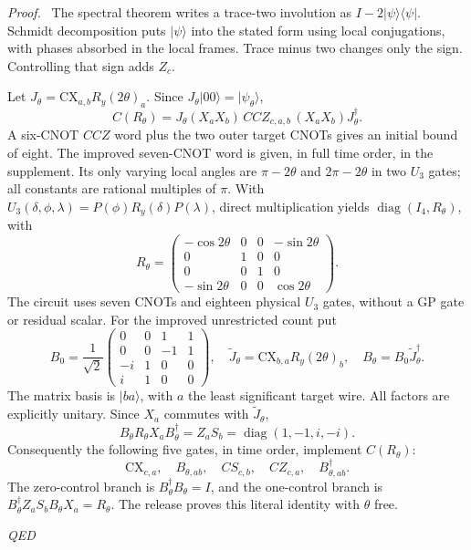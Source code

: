 \documentclass[a4paper,onecolumn,11pt,unpublished]{quantumarticle}
\newenvironment{proof}[1][Proof]{\par\noindent\textit{#1.}\ }{\hfill\textit{QED}\par}
\newcommand{\CNOT}{\mathrm{CX}}
\begin{document}
\begin{proof}
The spectral theorem writes a trace-two involution as $I-2|\psi\rangle
\langle\psi|$. Schmidt decomposition puts $|\psi\rangle$ into the stated
form using local conjugations, with phases absorbed in the local frames.
Trace minus two changes only the sign. Controlling that sign adds $Z_c$.

Let $J_\theta=\CNOT_{a,b}R_y(2\theta)_a$. Since
$J_\theta|00\rangle=|\psi_\theta\rangle$,
\begin{equation}\label{eq:reflectionword}
 C(R_\theta)=J_\theta(X_aX_b)\,CCZ_{c,a,b}\,(X_aX_b)J_\theta^\dagger.
\end{equation}
A six-CNOT $CCZ$ word plus the two outer target CNOTs gives an initial
bound of eight. The improved seven-CNOT word is given, in full time order,
in the supplement. Its only varying local angles are $\pi-2\theta$ and
$2\pi-2\theta$ in two $U_3$ gates; all constants are rational multiples of
$\pi$. With $U_3(\delta,\phi,\lambda)=P(\phi)R_y(\delta)P(\lambda)$,
direct multiplication yields $\operatorname{diag}(I_4,R_\theta)$, with
\[
 R_\theta=\begin{pmatrix}
 -\cos2\theta&0&0&-\sin2\theta\\
 0&1&0&0\\0&0&1&0\\
 -\sin2\theta&0&0&\cos2\theta
 \end{pmatrix}.
\]
The circuit uses seven CNOTs and eighteen physical $U_3$ gates, without a
GP gate or residual scalar. For the improved unrestricted count put
\[
 B_0=\frac1{\sqrt2}\begin{pmatrix}
 0&0&1&1\\0&0&-1&1\\-i&1&0&0\\i&1&0&0
 \end{pmatrix},\quad
 \widetilde J_\theta=\CNOT_{b,a}R_y(2\theta)_b,\quad
 B_\theta=B_0\widetilde J_\theta^\dagger.
\]
The matrix basis is $|ba\rangle$, with $a$ the least significant target wire.
All factors are explicitly unitary. Since $X_a$ commutes with
$\widetilde J_\theta$,
\[
 B_\theta R_\theta X_aB_\theta^\dagger=Z_aS_b
       =\operatorname{diag}(1,-1,i,-i).
\]
Consequently the following five gates, in time order, implement $C(R_\theta)$:
\begin{equation}\label{eq:five-reflection}
 \CNOT_{c,a},\quad B_{\theta,ab},\quad CS_{c,b},\quad
 CZ_{c,a},\quad B_{\theta,ab}^\dagger.
\end{equation}
The zero-control branch is $B_\theta^\dagger B_\theta=I$, and the one-control
branch is $B_\theta^\dagger Z_aS_bB_\theta X_a=R_\theta$.
The release proves this literal identity with $\theta$ free.


\end{proof}
\end{document}
